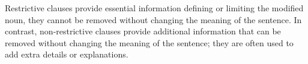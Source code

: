 



\noindent Restrictive clauses provide essential information defining or limiting the modified noun, they cannot be removed without changing the meaning of the sentence.
In contrast, non-restrictive clauses provide additional information that can be removed without changing the meaning of the sentence; they are often used to add extra details or explanations.
